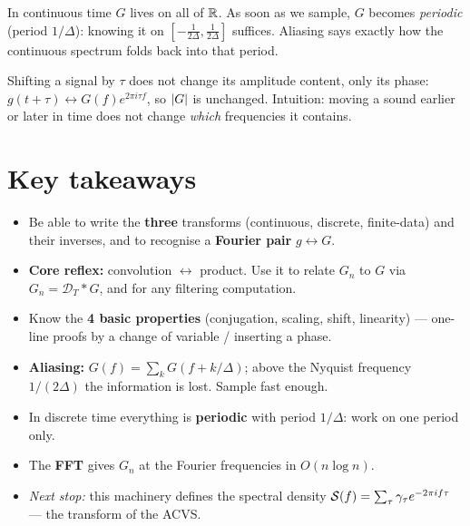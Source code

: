 \documentclass[11pt]{article}
\providecommand{\Dir}{\mathcal{D}}
\begin{document}
\begin{intu}[Discrete = continuous, but periodic and folded]
In continuous time $G$ lives on all of $\mathbb{R}$. As soon as we sample, $G$ becomes \emph{periodic} (period $1/\Delta$): knowing it on $[-\tfrac1{2\Delta},\tfrac1{2\Delta}]$ suffices. Aliasing says exactly how the continuous spectrum folds back into that period.
\end{intu}

\begin{exmpl}
Shifting a signal by $\tau$ does not change its amplitude content, only its phase: $g(t+\tau)\leftrightarrow G(f)e^{2\pi i\tau f}$, so $\left\lvert G \right\rvert$ is unchanged. Intuition: moving a sound earlier or later in time does not change \emph{which} frequencies it contains.
\end{exmpl}

\section*{Key takeaways}

\begin{retenir}
\begin{itemize}
\item Be able to write the \textbf{three} transforms (continuous, discrete, finite-data) and their inverses, and to recognise a \textbf{Fourier pair} $g\leftrightarrow G$.
\item \textbf{Core reflex:} convolution $\leftrightarrow$ product. Use it to relate $G_n$ to $G$ via $G_n=\Dir_T*G$, and for any filtering computation.
\item Know the \textbf{4 basic properties} (conjugation, scaling, shift, linearity) --- one-line proofs by a change of variable / inserting a phase.
\item \textbf{Aliasing:} $G(f)=\sum_k G(f+k/\Delta)$; above the Nyquist frequency $1/(2\Delta)$ the information is lost. Sample fast enough.
\item In discrete time everything is \textbf{periodic} with period $1/\Delta$: work on one period only.
\item The \textbf{FFT} gives $G_n$ at the Fourier frequencies in $O(n\log n)$.
\item \emph{Next stop:} this machinery defines the spectral density $\mathcal{S}(f)=\sum_\tau\gamma_\tau e^{-2\pi i f\tau}$ --- the transform of the ACVS.
\end{itemize}
\end{retenir}
\end{document}
